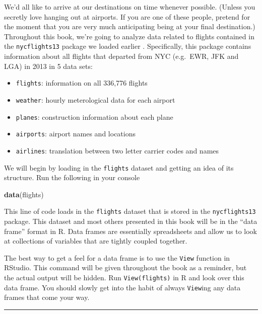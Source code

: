 \documentclass[]{tufte-book}
\newenvironment{Shaded}{\begin{snugshade}}{\end{snugshade}}
\newcommand{\KeywordTok}[1]{\textcolor[rgb]{0.13,0.29,0.53}{\textbf{{#1}}}}
\newcommand{\NormalTok}[1]{{#1}}
\let\oldrule=\rule
\renewcommand{\rule}[1]{\oldrule{\linewidth}}
\providecommand{\tightlist}{%
  \setlength{\itemsep}{0pt}\setlength{\parskip}{0pt}}
\begin{document}
We'd all like to arrive at our destinations on time whenever possible.
(Unless you secretly love hanging out at airports. If you are one of
these people, pretend for the moment that you are very much anticipating
being at your final destination.) Throughout this book, we're going to
analyze data related to flights contained in the \texttt{nycflights13}
package we loaded earlier \citep{R-nycflights13}. Specifically, this
package contains information about all flights that departed from NYC
(e.g.~EWR, JFK and LGA) in 2013 in 5 data sets:

\begin{itemize}
\tightlist
\item
  \texttt{flights}: information on all 336,776 flights
\item
  \texttt{weather}: hourly meterological data for each airport
\item
  \texttt{planes}: construction information about each plane
\item
  \texttt{airports}: airport names and locations
\item
  \texttt{airlines}: translation between two letter carrier codes and
  names
\end{itemize}

We will begin by loading in the \texttt{flights} dataset and getting an
idea of its structure. Run the following in your console

\begin{Shaded}
\begin{Highlighting}[]
\KeywordTok{data}\NormalTok{(flights)}
\end{Highlighting}
\end{Shaded}

This line of code loads in the \texttt{flights} dataset that is stored
in the \texttt{nycflights13} package. This dataset and most others
presented in this book will be in the ``data frame'' format in R. Data
frames are essentially spreadsheets and allow us to look at collections
of variables that are tightly coupled together.

The best way to get a feel for a data frame is to use the \texttt{View}
function in RStudio. This command will be given throughout the book as a
reminder, but the actual output will be hidden. Run
\texttt{View(flights)} in R and look over this data frame. You should
slowly get into the habit of always \texttt{View}ing any data frames
that come your way.

\begin{center}\rule{0.5\linewidth}{\linethickness}\end{center}
\end{document}
